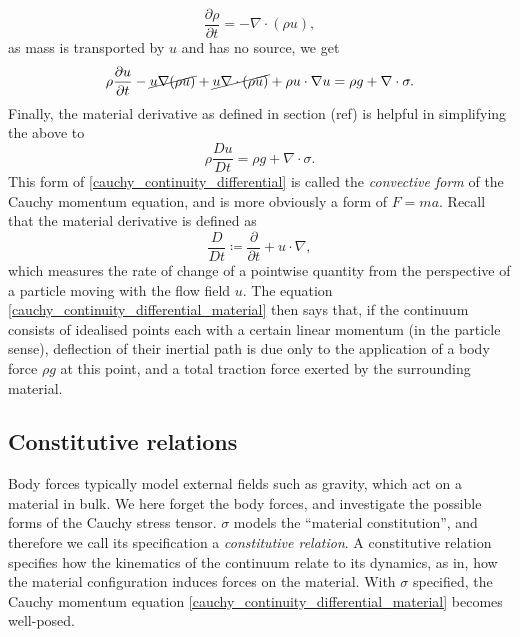\documentclass[11pt,a4paper]{memoir}
\newcommand{\omn}{{\Omega_0}}
\newcommand{\Part}[2]{\frac{\partial #1}{\partial #2}}
\begin{document}
$$\Part{\rho}{t} = -\nabla\cdot(\rho u),$$
as mass is transported by $u$ and has no source, we get
$$
    \rho\Part{u}{t} -\cancel{u\nabla(\rho u)} + \cancel{u\nabla\cdot (\rho u)} + \rho u\cdot\nabla u = \rho g + \nabla\cdot\sigma.
$$
Finally, the material derivative as defined in section (ref) is helpful in simplifying the above to
\begin{equation}\label{cauchy_continuity_differential_material}
    \rho\frac{Du}{Dt} = \rho g + \nabla\cdot\sigma.
\end{equation}
This form of \eqref{cauchy_continuity_differential} is called the \textit{convective form} of the Cauchy momentum equation, and is more obviously a form of $F = ma$.
Recall that the material derivative is defined as
    $$\frac{D}{Dt} \coloneqq \Part{}{t} + u\cdot \nabla,$$
which measures the rate of change of a pointwise quantity from the perspective of a particle moving with the flow field $u$.
The equation \eqref{cauchy_continuity_differential_material} then says that, if the continuum consists of idealised points
each with a certain linear momentum (in the particle sense), deflection of their inertial path is due only to the application
of a body force $\rho g$ at this point, and a total traction force exerted by the surrounding material.


\subsection{Constitutive relations}
Body forces typically model
external fields such as gravity, which act on a material in bulk. We here forget the body forces, and investigate the possible forms of the
Cauchy stress tensor.
$\sigma$ models the ``material constitution'', and
therefore we call its specification a \textit{constitutive relation}.
A constitutive relation specifies how the kinematics of the continuum relate to its dynamics, as in, how the material configuration
induces forces on the material. With $\sigma$ specified, the Cauchy momentum equation \eqref{cauchy_continuity_differential_material} becomes well-posed.
\end{document}
